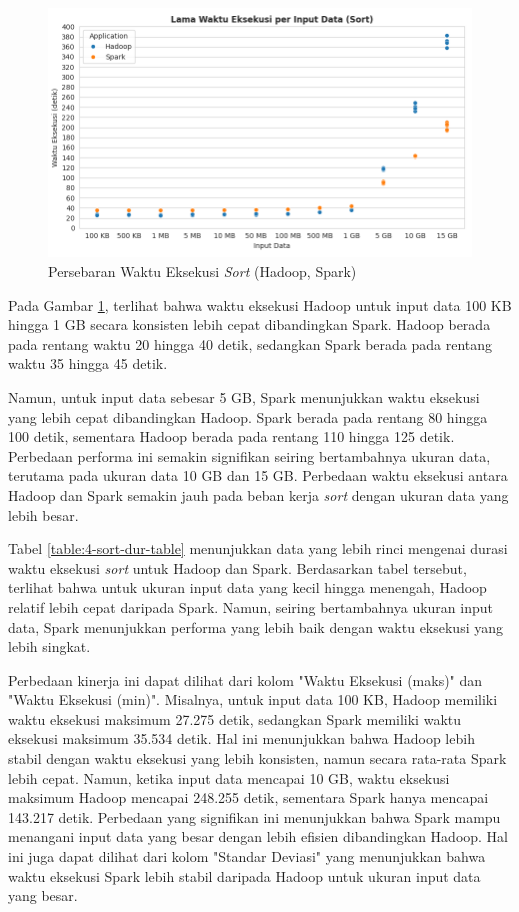 \begin{figure}[h]
    \centering
    \includegraphics[width=1\textwidth]{figures/ch04/1-lama-waktu-eksekusi-sort.png}
    \caption{Persebaran Waktu Eksekusi \textit{Sort} (Hadoop, Spark)}
    \label{fig:lama-waktu-eksekusi-sort}
\end{figure}

Pada Gambar \ref{fig:lama-waktu-eksekusi-sort}, terlihat bahwa waktu eksekusi Hadoop untuk input data 100 KB hingga 1 GB secara konsisten lebih cepat dibandingkan Spark. Hadoop berada pada rentang waktu 20 hingga 40 detik, sedangkan Spark berada pada rentang waktu 35 hingga 45 detik.

Namun, untuk input data sebesar 5 GB, Spark menunjukkan waktu eksekusi yang lebih cepat dibandingkan Hadoop. Spark berada pada rentang 80 hingga 100 detik, sementara Hadoop berada pada rentang 110 hingga 125 detik. Perbedaan performa ini semakin signifikan seiring bertambahnya ukuran data, terutama pada ukuran data 10 GB dan 15 GB. Perbedaan waktu eksekusi antara Hadoop dan Spark semakin jauh pada beban kerja \textit{sort} dengan ukuran data yang lebih besar.

Tabel \ref{table:4-sort-dur-table} menunjukkan data yang lebih rinci mengenai durasi waktu eksekusi \textit{sort} untuk Hadoop dan Spark. Berdasarkan tabel tersebut, terlihat bahwa untuk ukuran input data yang kecil hingga menengah, Hadoop relatif lebih cepat daripada Spark. Namun, seiring bertambahnya ukuran input data, Spark menunjukkan performa yang lebih baik dengan waktu eksekusi yang lebih singkat.

Perbedaan kinerja ini dapat dilihat dari kolom "Waktu Eksekusi (maks)" dan "Waktu Eksekusi (min)". Misalnya, untuk input data 100 KB, Hadoop memiliki waktu eksekusi maksimum 27.275 detik, sedangkan Spark memiliki waktu eksekusi maksimum 35.534 detik. Hal ini menunjukkan bahwa Hadoop lebih stabil dengan waktu eksekusi yang lebih konsisten, namun secara rata-rata Spark lebih cepat. Namun, ketika input data mencapai 10 GB, waktu eksekusi maksimum Hadoop mencapai 248.255 detik, sementara Spark hanya mencapai 143.217 detik. Perbedaan yang signifikan ini menunjukkan bahwa Spark mampu menangani input data yang besar dengan lebih efisien dibandingkan Hadoop. Hal ini juga dapat dilihat dari kolom "Standar Deviasi" yang menunjukkan bahwa waktu eksekusi Spark lebih stabil daripada Hadoop untuk ukuran input data yang besar.

